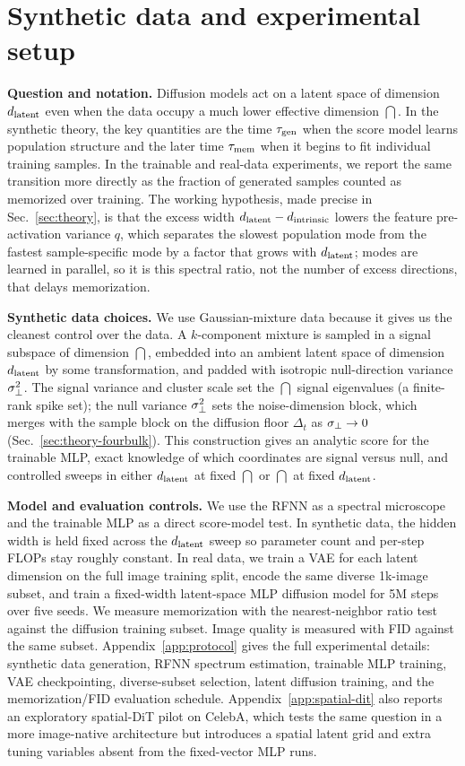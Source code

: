 \section{Synthetic data and experimental setup}
\label{sec:design}

\textbf{Question and notation.}
Diffusion models act on a latent space of dimension $d_{\mathrm{latent}}$ even when the data occupy a much lower effective dimension $\dint$. In the synthetic theory, the key quantities are the time $\tau_{\mathrm{gen}}$ when the score model learns population structure and the later time $\tau_{\mathrm{mem}}$ when it begins to fit individual training samples. In the trainable and real-data experiments, we report the same transition more directly as the fraction of generated samples counted as memorized over training. The working hypothesis, made precise in Sec.~\ref{sec:theory}, is that the excess width $d_{\mathrm{latent}}-d_{\mathrm{intrinsic}}$ lowers the feature pre-activation variance $q$, which separates the slowest population mode from the fastest sample-specific mode by a factor that grows with $d_{\mathrm{latent}}$; modes are learned in parallel, so it is this spectral ratio, not the number of excess directions, that delays memorization.

\textbf{Synthetic data choices.}
We use Gaussian-mixture data because it gives us the cleanest control over the data. A $k$-component mixture is sampled in a signal subspace of dimension $\dint$, embedded into an ambient latent space of dimension $d_{\mathrm{latent}}$ by some transformation, and padded with isotropic null-direction variance $\sigma_{\perp}^2$. The signal variance and cluster scale set the $\dint$ signal eigenvalues (a finite-rank spike set); the null variance $\sigma_{\perp}^2$ sets the noise-dimension block, which merges with the sample block on the diffusion floor $\Delta_t$ as $\sigma_{\perp}\to0$ (Sec.~\ref{sec:theory-fourbulk}). This construction gives an analytic score for the trainable MLP, exact knowledge of which coordinates are signal versus null, and controlled sweeps in either $d_{\mathrm{latent}}$ at fixed $\dint$ or $\dint$ at fixed $d_{\mathrm{latent}}$.

\textbf{Model and evaluation controls.}
We use the RFNN as a spectral microscope and the trainable MLP as a direct score-model test. In synthetic data, the hidden width is held fixed across the $d_{\mathrm{latent}}$ sweep so parameter count and per-step FLOPs stay roughly constant. In real data, we train a VAE for each latent dimension on the full image training split, encode the same diverse 1k-image subset, and train a fixed-width latent-space MLP diffusion model for 5M steps over five seeds. We measure memorization with the \citet{somepalli2023diffusion} nearest-neighbor ratio test against the diffusion training subset. Image quality is measured with FID against the same subset. Appendix~\ref{app:protocol} gives the full experimental details: synthetic data generation, RFNN spectrum estimation, trainable MLP training, VAE checkpointing, diverse-subset selection, latent diffusion training, and the memorization/FID evaluation schedule. Appendix~\ref{app:spatial-dit} also reports an exploratory spatial-DiT pilot on CelebA, which tests the same question in a more image-native architecture but introduces a spatial latent grid and extra tuning variables absent from the fixed-vector MLP runs.
